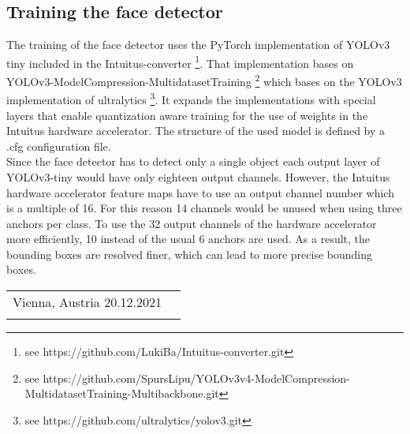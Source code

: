 \documentclass[%
a4paper,
twoside,
openany,
dvipsnames
]
{report}
\makeatletter
\newcommand{\submissiondate}{20.12.2021}
\let\theauthor\@author
\makeatother
\begin{document}
	\subsection{Training the face detector}
	The training of the face detector uses the PyTorch implementation of YOLOv3 tiny included in the Intuitus-converter \footnote{see https://github.com/LukiBa/Intuitus-converter.git}. That implementation bases on YOLOv3-ModelCompression-MultidatasetTraining \footnote{see https://github.com/SpursLipu/YOLOv3v4-ModelCompression-MultidatasetTraining-Multibackbone.git} which bases on the YOLOv3 implementation of ultralytics \footnote{see https://github.com/ultralytics/yolov3.git}. It expands the implementations with special layers that enable quantization aware training for the use of weights in the Intuitus hardware accelerator. The structure of the used model is defined by a .cfg configuration file. \\
	Since the face detector has to detect only a single object each output layer of YOLOv3-tiny would have only eighteen output channels. However, the Intuitus hardware accelerator feature maps have to use an output channel number which is a multiple of 16. For this reason 14 channels would be unused when using three anchors per class. To use the 32 output channels of the hardware accelerator more efficiently, 10 instead of the usual 6 anchors are used. As a result, the bounding boxes are resolved finer, which can lead to more precise bounding boxes. \\
	
	
	
	

	
	
	\vspace{3cm}
	
	\thispagestyle{empty}
	\begin{center}
		\begin{tabular}{@{}p{3.5in}p{2.5in}@{}}
			Vienna, Austria \submissiondate & \hrulefill \\
			& \centering \theauthor  \\
		\end{tabular}
	\end{center}
	
\end{document}
